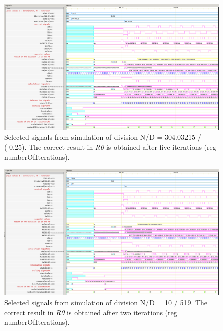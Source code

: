 \documentclass[a4paper, twoside, 11pt]{article}
\begin{document}
\begin{figure}[htbp!]
  \centering
  \includegraphics[width=1\textwidth]{src/png/inverted/division-304-03215-div-min-0-25.png}
    \caption{Selected signals from simulation of division N/D = 304.03215 / (-0.25). The correct result in \textit{R0} is obtained after five iterations (reg numberOfIterations).}
  \label{fig:division-304-03215-div-min-0-25}
\end{figure}

\begin{figure}[htbp!]
  \centering
  \includegraphics[width=1\textwidth]{src/png/inverted/division-10-div-519.png}
    \caption{Selected signals from simulation of division N/D = 10 / 519. The correct result in \textit{R0} is obtained after two iterations (reg numberOfIterations).}
  \label{fig:division-10-div-519}
\end{figure}
\end{document}
